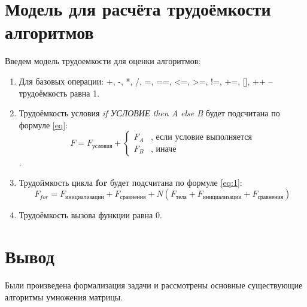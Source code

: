 \section{Модель для расчёта трудоёмкости алгоритмов}
Введем модель трудоемкости для оценки алгоритмов:
\begin{enumerate}
	\item Для базовых операции: +, -, *, /, =, ==, <=, >=, !=, +=, [], ++ -- трудоёмкость равна 1.
	\item Трудоёмкость условия \textit{if УСЛОВИЕ then A else B} будет подсчитана по формуле \ref{eq}:
	\begin{equation}
		\label{eq}
		F = F_{условия} +
		\begin{cases}
			F_A &\text{, если условие выполняется}\\
			F_B &\text{, иначе}
		\end{cases}
	\end{equation}.
	\item Трудоймкость цикла \textbf{for} будет подсчитана по формуле \ref{eq:1}:
	\begin{equation}
		\label{eq:1}
		F_{for} = F_{инициализации} + F_{сравнения} + 
		N(F_{тела} + F_{инициализации} + F_{сравнения})
	\end{equation}
	\item Трудоёмкость вызова функции равна 0.
\end{enumerate}

\section{Вывод}
Были произведена формализация задачи и рассмотрены основные существующие алгоритмы умножения матрицы.